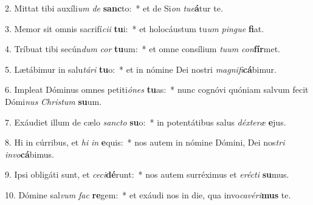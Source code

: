 2. Mittat tibi auxíli\textit{um} \textit{de} \textbf{sanc}to:~*  et de Si\textit{on} \textit{tu}\textit{e}\textbf{á}tur te.\

3. Memor sit omnis sacrifí\textit{ci}\textit{i} \textbf{tu}i:~*  et holocáustum tu\textit{um} \textit{pin}\textit{gue} \textbf{fi}at.\

4. Tríbuat tibi secún\textit{dum} \textit{cor} \textbf{tu}um:~*  et omne consílium \textit{tu}\textit{um} \textit{con}\textbf{fír}met.\

5. Lætábimur in salu\textit{tá}\textit{ri} \textbf{tu}o:~*  et in nómine Dei nostri \textit{ma}\textit{gni}\textit{fi}\textbf{cá}bimur.\

6. Impleat Dóminus omnes petiti\textit{ó}\textit{nes} \textbf{tu}as:~*  nunc cognóvi quóniam salvum fecit Dómi\textit{nus} \textit{Chris}\textit{tum} \textbf{su}um.\

7. Exáudiet illum de cælo \textit{sanc}\textit{to} \textbf{su}o:~*  in potentátibus salus \textit{déx}\textit{te}\textit{ræ} \textbf{e}jus.\

8. Hi in cúrribus, et \textit{hi} \textit{in} \textbf{e}quis:~*  nos autem in nómine Dómini, Dei nos\textit{tri} \textit{in}\textit{vo}\textbf{cá}bimus.\

9. Ipsi obligáti sunt, et \textit{ce}\textit{ci}\textbf{dé}runt:~*  nos autem surréximus et \textit{e}\textit{réc}\textit{ti} \textbf{su}mus.\

10. Dómine sal\textit{vum} \textit{fac} \textbf{re}gem:~*  et exáudi nos in die, qua invo\textit{ca}\textit{vé}\textit{ri}\textbf{mus} te.\

